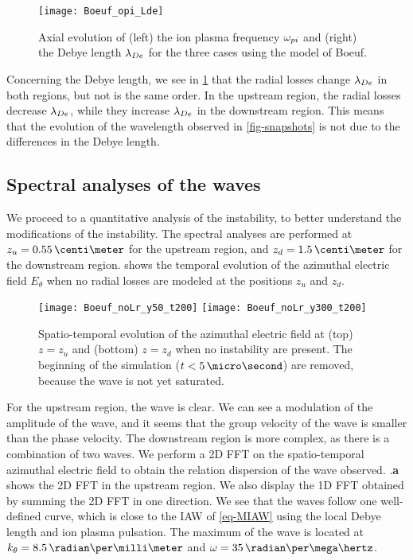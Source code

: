 \begin{figure}[hbt]
  \centering
  \texttt{[image: Boeuf\_opi\_Lde]}
  \caption{Axial evolution of (left) the ion plasma frequency $\omega_{pi}$ and (right) the Debye length $\lambda_{De}$ for the three cases using the model of Boeuf.}
  \label{fig-wpi_Lde}
\end{figure}


Concerning the Debye length, we see in \cref{fig-wpi_Lde} that the radial losses change $\lambda_{De}$ in both regions, but not is the same order.
In the upstream region, the radial losses decrease $\lambda_{De}$, while they increase $\lambda_{De}$ in the downstream region.
This means that the evolution of the wavelength observed in \cref{fig-snapshots} is not due to the differences in the Debye length.

\subsection{Spectral analyses of the waves} \label{subsec-fft}

We proceed to a quantitative analysis of the instability, to better understand the modifications of the instability.
The spectral analyses are performed at $z_u=0.55\,\centi\meter$ for the upstream region, and $z_d=1.5\,\centi\meter$ for the downstream region.
 shows the temporal evolution of the azimuthal electric field $E_{\theta}$ when no radial losses are modeled at the positions $z_u$ and $z_d$.

\begin{figure}[hbt]
  \centering
  \texttt{[image: Boeuf\_noLr\_y50\_t200]}
  \texttt{[image: Boeuf\_noLr\_y300\_t200]}
  \caption{Spatio-temporal evolution of the azimuthal electric field at (top) $z=z_u$ and (bottom) $z=z_d$ when no instability are present. The beginning of the simulation ($t<5\,\micro\second$) are removed, because the wave is not yet saturated. }
  \label{fig-cut2D}
\end{figure}


For the upstream region, the wave is clear. 
We can see a modulation of the amplitude of the wave, and it seems that the group velocity of the wave is smaller than the phase velocity.
The downstream region is more complex, as there is a combination of two waves.
We perform a \ac{2D} \ac{FFT} on the spatio-temporal azimuthal electric field to obtain the relation dispersion of the wave observed.
.{\bf a} shows the \ac{2D} \ac{FFT} in the upstream region.
We also display the \ac{1D} \ac{FFT} obtained by summing the \ac{2D} \ac{FFT} in one direction.
We see that the waves follow one well-defined curve, which is close to the \ac{IAW} of \cref{eq-MIAW} using the local Debye length and ion plasma pulsation.
The maximum of the wave is located at $k_{\theta} = 8.5\,\radian\per\milli\meter$ and $\omega = 35\, \radian\per\mega\hertz$.

